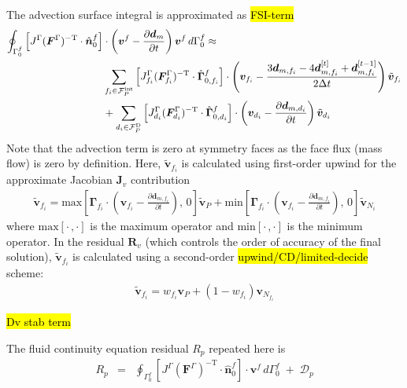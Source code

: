 \documentclass[sn-mathphys,Numbered]{sn-jnl}%
\newcommand{\bb}{\boldsymbol}
\begin{document}
The advection surface integral is approximated as \hl{FSI-term}
\begin{align}
	\oint_{\Gamma^f_0}  \left[ J^\Gamma (\bb{F}^\Gamma)^{-\text{T}} \cdot \hat{\bb{n}}_0^f \right]
		& \cdot \left(\bb{v}^f - \frac{\partial \bb{d}_m}{\partial t}\right) \bb{v}^f \, d\Gamma^f_0
		\approx \notag \\
		& \sum_{f_i \in \mathcal{F}_P^{\text{int}}}
	\left[ J^\Gamma_{f_i} (\bb{F}^\Gamma_{f_i})^{-\text{T}} \cdot \hat{\bb{\Gamma}}_{0, f_i}^f \right]
		\cdot \left( \bb{v}_{f_i} - \frac{3 \bb{d}_{m,f_i} - 4 \bb{d}_{m,f_i}^{[t]} + \bb{d}_{m,f_i}^{[t-1]}}{2\Delta t}  \right) \tilde{\bb{v}}_{f_i} \notag \\
	&+ \sum_{d_i \in \mathcal{F}_P^{\text{D}}} \left[ J^\Gamma_{d_i} (\bb{F}^\Gamma_{d_i})^{-\text{T}} \cdot \hat{\bb{\Gamma}}_{0, d_i}^f \right]
		 \cdot \left( \bb{v}_{d_i} - \frac{\partial \bb{d}_{m,d_i}}{\partial t} \right) \tilde{\bb{v}}_{d_i}
\end{align}
Note that the advection term is zero at symmetry faces as the face flux (mass flow) is zero by definition.
Here, $\tilde{\bb{v}}_{f_i}$ is calculated using first-order upwind for the approximate Jacobian $\bb{J}_v$ contribution
\begin{eqnarray}
	\tilde{\bb{v}}_{f_i} =
		\text{max}\left[ \bb{\Gamma}_{f_i} \cdot \left( \bb{v}_{f_i} - \frac{\partial \bb{d}_{m,f_i}}{\partial t} \right), \, 0\right] \tilde{\bb{v}}_P
		+ \text{min}\left[ \bb{\Gamma}_{f_i} \cdot \left( \bb{v}_{f_i} - \frac{\partial \bb{d}_{m,f_i}}{\partial t} \right), \, 0\right] \tilde{\bb{v}}_{N_i}
\end{eqnarray}
where $\text{max}\left[\cdot \,, \cdot \right]$ is the maximum operator and $\text{min}\left[\cdot \,, \cdot \right]$ is the minimum operator.
In the residual $\bb{R}_v$ (which controls the order of accuracy of the final solution), $\tilde{\bb{v}}_{f_i}$ is calculated using a second-order \hl{upwind/CD/limited-decide} scheme:
\begin{eqnarray}
	\tilde{\bb{v}}_{f_i} =  w_{f_i} \bb{v}_P + (1 - w_{f_i}) \bb{v}_{N_{f_i}}
\end{eqnarray}

\hl{Dv stab term}

The fluid continuity equation residual $R_p$ repeated here is
\begin{eqnarray}
    R_p
    &=&	\oint_{\Gamma^f_0}  \left[ J^\Gamma (\bb{F}^\Gamma)^{-\text{T}}  \cdot \hat{\bb{n}}_0^f \right] \cdot \bb{v}^f \, d\Gamma^f_0 \;+\; \mathcal{D}_p
\end{eqnarray}
\end{document}
